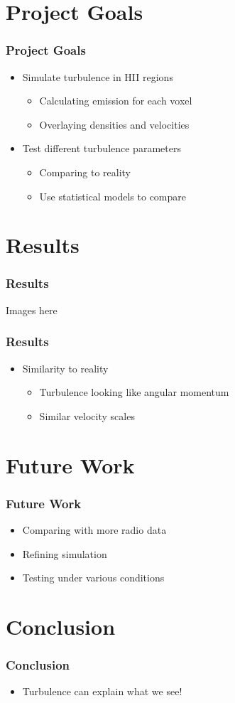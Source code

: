 \documentclass[aspectratio=169,compress]{beamer}
\begin{document}
\section{Project Goals}
\begin{frame}
  \frametitle{Project Goals}
  \begin{itemize}
    \item Simulate turbulence in HII regions
      \begin{itemize}
        \item Calculating emission for each voxel
        \item Overlaying densities and velocities
      \end{itemize}
    \item Test different turbulence parameters
      \begin{itemize}
        \item Comparing to reality
        \item Use statistical models to compare
      \end{itemize}
  \end{itemize}
\end{frame}

\section{Results}
\begin{frame}
  \frametitle{Results}
  Images here
\end{frame}

\begin{frame}
  \frametitle{Results}
  \begin{itemize}
    \item Similarity to reality
      \begin{itemize}
        \item Turbulence looking like angular momentum
        \item Similar velocity scales
      \end{itemize}
  \end{itemize}
\end{frame}

\section{Future Work}
\begin{frame}
  \frametitle{Future Work}
  \begin{itemize}
    \item Comparing with more radio data
    \item Refining simulation
    \item Testing under various conditions
  \end{itemize}
\end{frame}

\section{Conclusion}
\begin{frame}
  \frametitle{Conclusion}
  \begin{itemize}
    \item Turbulence can explain what we see!
  \end{itemize}
\end{frame}
\end{document}
